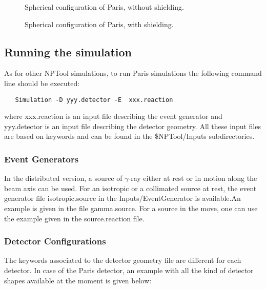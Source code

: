 \documentclass[a4paper,12pt]{article}
\begin{document}
\begin{figure*}[ht]
\begin{center}
\end{center}
\caption{Spherical configuration of Paris, without shielding.} 
\label{fig:Paris1}
\end{figure*}

\begin{figure*}[ht]
\begin{center}
\end{center}
\caption{Spherical configuration of Paris, with shielding.} 
\label{fig:Paris2}
\end{figure*}

\subsection{Running the simulation}
As for other NPTool simulations, to run Paris simulations the following command line should 
be executed: 

\begin{verbatim}
   Simulation -D yyy.detector -E  xxx.reaction
\end{verbatim}

where xxx.reaction is an input file describing the event generator and
yyy.detector is an input file describing the detector geometry. All these
input files are based on keywords and can be found in the 
\$NPTool/Inputs subdirectories.

\subsubsection{Event Generators}
In the distributed version, a source of $\gamma$-ray either at rest or in motion along the 
beam axis can be used. For an isotropic or a collimated source at rest, the event generator 
file isotropic.source in the Inputs/EventGenerator is available.An example is given in the 
file gamma.source. For a source in the move, one can use the example given in the 
source.reaction file.  

\subsubsection{Detector Configurations}
The keywords associated to the detector geometry file are different for 
each detector. In case of the Paris detector, an example with 
all the kind of detector shapes available at the moment is given below:
\end{document}
